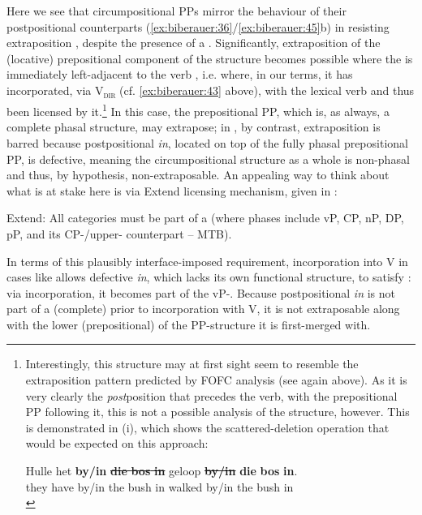 \documentclass[output=paper]{LSP/langsci}
\begin{document}
Here we see that circumpositional  PPs mirror the behaviour of their postpositional counterparts (\ref{ex:biberauer:36}/\ref{ex:biberauer:45}b) in resisting extraposition , despite the presence of a . Significantly, extraposition of the (locative) prepositional component of the structure becomes possible where the  is immediately left-adjacent to the verb , i.e. where, in our terms, it has incorporated, via V\textsc{\textsubscript{dir}} (cf. \ref{ex:biberauer:43} above), with the lexical verb and thus been licensed by it.\footnote{Interestingly, this structure may at first sight seem to resemble the extraposition pattern predicted by  FOFC analysis (see again  above). As it is very clearly the \textit{post}position that precedes the verb, with the prepositional PP following it, this is not a possible analysis of the structure, however. This is demonstrated in (i), which shows the scattered-deletion operation that would be expected on this approach:

\ea
\gll Hulle het    \textbf{by/in} \sout{\textbf{die} \textbf{bos} \textbf{in}} geloop \sout{\textbf{by/in}} \textbf{die} \textbf{bos} \textbf{in}.\\
they   have by/in  the bush in walked by/in the  bush in\\
\z
}  In this case, the prepositional PP, which is, as always, a complete phasal structure, may extrapose; in , by contrast, extraposition is barred because postpositional \textit{in}, located on top of the fully phasal prepositional PP, is defective, meaning the circumpositional structure as a whole is non-phasal and thus, by hypothesis, non-extraposable. An appealing way to think about what is at stake here is via  Extend licensing mechanism, given in :

\ea%
    \label{ex:biberauer:48}
	  Extend: All categories must be part of a  (where phases include vP, CP, nP, DP, pP, and its CP-/upper- counterpart – MTB).
\z

In terms of this plausibly interface-imposed requirement, incorporation into V in cases like  allows defective  \textit{in}, which lacks its own functional structure, to satisfy : via incorporation, it becomes part of the vP-. Because postpositional \textit{in} is not part of a (complete)  prior to incorporation with V, it is not extraposable along with the lower (prepositional)  of the PP-structure it is first-merged with. 
\end{document}

